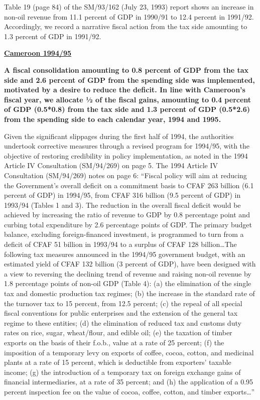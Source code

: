 Table 19 (page 84) of the SM/93/162 (July 23, 1993) report shows an increase in non-oil revenue from 11.1 percent of GDP in 1990/91 to 12.4 percent in 1991/92. Accordingly, we record a narrative fiscal action from the tax side amounting to 1.3 percent of GDP in 1991/92.

\textbf{\underline{Cameroon 1994/95}}

\textbf{A fiscal consolidation amounting to 0.8  percent of GDP from the tax side and 2.6 percent of GDP from the spending side was implemented, motivated by a desire to reduce the deficit. In line with Cameroon’s fiscal year, we allocate ½ of the fiscal gains, amounting to 0.4 percent of GDP (0.5*0.8) from the tax side and 1.3 percent of GDP (0.5*2.6) from the spending side to each calendar year, 1994 and 1995.}

Given the significant slippages during the first half of 1994, the authorities undertook corrective measures through a revised program for 1994/95, with the objective of restoring credibility in policy implementation, as noted in the 1994 Article IV Consultation (SM/94/269) on page 5. The 1994 Article IV Consultation (SM/94/269) notes on page 6: “Fiscal policy will aim at reducing the Government's overall deficit on a commitment basis to CFAF 263 billion (6.1 percent of GDP) in 1994/95, from CFAF 316 billion (9.5 percent of GDP) in 1993/94 (Tables 1 and 3). The reduction in the overall fiscal deficit would be achieved by increasing the ratio of revenue to GDP by 0.8 percentage point and curbing total expenditure by 2.6 percentage points of GDP. The primary budget balance, excluding foreign-financed investment, is programmed to turn from a deficit of CFAF 51 billion in 1993/94 to a surplus of CFAF 128 billion…The following tax measures announced in the 1994/95 government budget, with an estimated yield of CFAF 132 billion (3 percent of GDP), have been designed with a view to reversing the declining trend of revenue and raising non-oil revenue by 1.8 percentage points of non-oil GDP (Table 4): (a) the elimination of the single tax and domestic production tax regimes; (b) the increase in the standard rate of the turnover tax to 15 percent, from 12.5 percent; (c) the repeal of all special fiscal conventions for public enterprises and the extension of the general tax regime to these entities; (d) the elimination of reduced tax and customs duty rates on rice, sugar, wheat/flour, and edible oil; (e) the taxation of timber exports on the basis of their f.o.b., value at a rate of 25 percent; (f) the imposition of a temporary levy on exports of coffee, cocoa, cotton, and medicinal plants at a rate of 15 percent, which is deductible from exporters' taxable income; (g) the introduction of a temporary tax on foreign exchange gains of financial intermediaries, at a rate of 35 percent; and (h) the application of a 0.95 percent inspection fee on the value of cocoa, coffee, cotton, and timber exports…”

